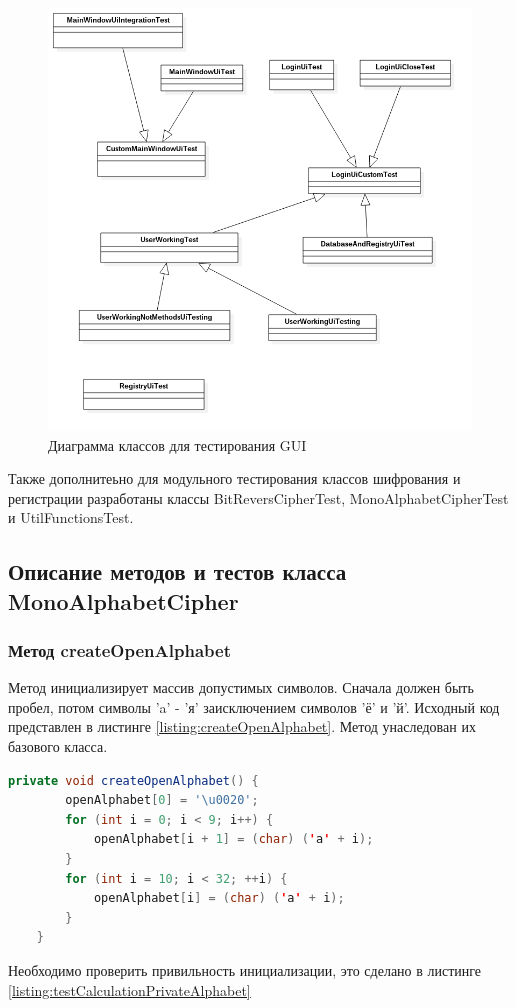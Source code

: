 \documentclass[a4paper,12pt]{article}
\begin{document}
\begin{center}
	\begin{figure}[h!]
		\centering
		\includegraphics[scale=0.6]{img/class_diagram_ui_tests.png}
		\caption{Диаграмма классов для тестирования GUI}
		\label{fig:class_diagram_tests_gui}
	\end{figure}
\end{center}

Также дополнитеьно для модульного тестирования классов шифрования и регистрации разработаны классы BitReversCipherTest, MonoAlphabetCipherTest и UtilFunctionsTest.

\newpage\subsection{Описание методов и тестов класса MonoAlphabetCipher}
\subsubsection{Метод createOpenAlphabet}
Метод инициализирует массив допустимых символов. Сначала должен быть пробел, потом символы 'a' - 'я' заисключением символов 'ё' и 'й'. Исходный код представлен в листинге \ref{listing:createOpenAlphabet}. Метод унаследован их базового класса.
\begin{lstlisting}[language=java, caption=метод createOpenAlphabet, label = listing:createOpenAlphabet]
	private void createOpenAlphabet() {
        openAlphabet[0] = '\u0020';
        for (int i = 0; i < 9; i++) {
            openAlphabet[i + 1] = (char) ('а' + i);
        }
        for (int i = 10; i < 32; ++i) {
            openAlphabet[i] = (char) ('а' + i);
        }
    }
\end{lstlisting}
Необходимо проверить привильность инициализации, это сделано в листинге \ref{listing:testCalculationPrivateAlphabet}
\end{document}
